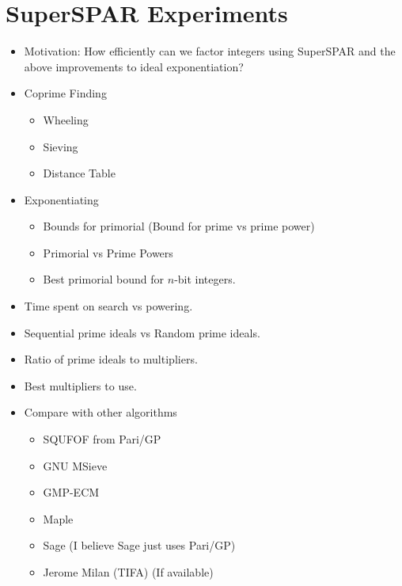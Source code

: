 \documentclass[11pt, letterpaper]{article}
\theoremstyle{definition}
\begin{document}
\bigbreak
\section{SuperSPAR Experiments}
\begin{itemize}
\item Motivation: How efficiently can we factor integers using SuperSPAR and the above improvements to ideal exponentiation?


\item Coprime Finding
	\begin{itemize}
	\item Wheeling
	\item Sieving
	\item Distance Table
	\end{itemize}

	\item Exponentiating 
	\begin{itemize}
	\item Bounds for primorial (Bound for prime vs prime power)
	\item Primorial vs Prime Powers
	\item Best primorial bound for $n$-bit integers.
	\end{itemize}
	
\item Time spent on search vs powering.
\item Sequential prime ideals vs Random prime ideals.
\item Ratio of prime ideals to multipliers.
\item Best multipliers to use.

\item Compare with other algorithms
	\begin{itemize}
	\item SQUFOF from Pari/GP
	\item GNU MSieve
	\item GMP-ECM
	\item Maple
	\item Sage (I believe Sage just uses Pari/GP)
	\item Jerome Milan (TIFA) (If available)
	\end{itemize}

\end{itemize}




\bigbreak
\end{document}
